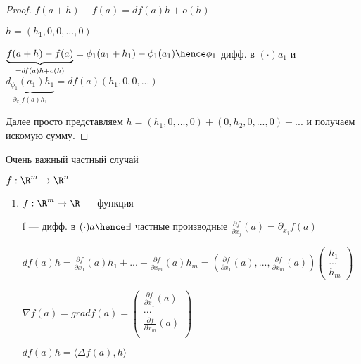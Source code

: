 \begin{proof}
    $f(a + h) - f(a) = df(a)h + o(h)$ 

    $h = (h_1, 0, 0, ..., 0)$

    $\underbrace{f(a + h) - f(a)}_{ = df(a)h + o(h)} = \phi_1(a_1 + h_1) - \phi_1(a_1) \hence \phi_1$ дифф. в $(\cdot) a_1$ и 
    $\underbrace{d_{\phi_1}(a_1)h_1}_{\partial_{x_1} f(a)h_1} = df(a)(h_1, 0, 0, ...)$  

    Далее просто представляем $h = (h_1, 0, ..., 0) + (0, h_2, 0, ..., 0) + ...$ и получаем искомую сумму.
\end{proof}

\underline{Очень важный частный случай}

$f : \R ^ m \to \R^n$

\begin{enumerate}
    

    \item $f : \R ^ m \to \R$ --- функция
    
    f --- дифф. в $(\cdot)a \hence \exists $ частные производные $\frac{\partial f}{\partial {x_j}}(a) = \partial _{x_j}f(a)$

    $df(a)h = \frac{\partial f}{\partial x_1}(a)h_1 + ... + \frac{\partial f}{\partial x_m}(a)h_m = \left( \frac{\partial f}{\partial x_1}(a), ... , \frac{\partial f}{\partial x_m}(a)\right) \begin{pmatrix}
        h_1\\
        ...\\
        h_m
    \end{pmatrix}$

    \begin{definition}
        $ \nabla f(a) = grad f(a) = \begin{pmatrix}
            \frac{\partial f}{\partial x_1}(a)\\
            ...\\
            \frac{\partial f}{\partial x_m}(a)\\
        \end{pmatrix}$

        $df(a)h = \langle \Delta f(a), h \rangle$
    \end{definition}
\end{enumerate}


